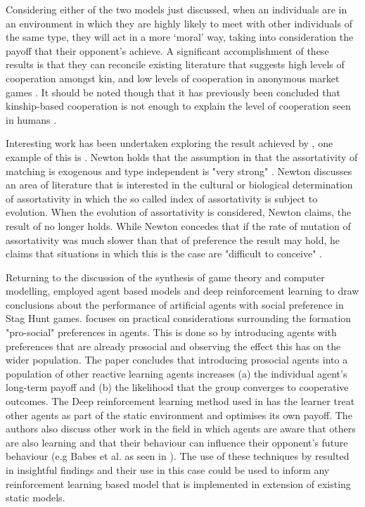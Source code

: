 \documentclass[11pt]{book}
\newcommand*{\np}{\par\noindent\newline}
\begin{document}
Considering either of the two models just discussed, when an individuals are in an environment in which they are highly likely
to meet with other individuals of the same type, they will act in a more `moral' way, taking into consideration the
payoff that their opponent's achieve. A significant accomplishment of these results is that they can reconcile existing
literature that suggests high levels of cooperation amongst kin, and low levels of cooperation in anonymous market games \citep[See ][~p. 2296]{alger_homo_2013}. 
It should be noted though that it has previously been concluded that kinship-based cooperation is not enough to explain the level of cooperation seen in humans \citep{van_veelen_why_2006}. 

\np Interesting work has been undertaken exploring the result achieved by \citet{alger_homo_2013}, one example of this
is \citet{newton_preferences_2017}. Newton holds that the assumption in \citet{alger_homo_2013} that the assortativity
of matching is exogenous and type independent is "very strong" \citep{newton_preferences_2017}. Newton discusses an area
of literature that is interested in the cultural or biological determination of assortativity in which the
so called index of assortativity is subject to evolution. When the evolution of assortativity is considered, Newton
claims, the result of \citet{alger_homo_2013} no longer holds. While Newton concedes that if the rate of mutation of
assortativity was much slower than that of preference the result may hold, he claims that situations in which this is
the case are "difficult to conceive" \citep{newton_preferences_2017}.

\np Returning to the discussion of the synthesis of game theory and computer modelling, \citet{peysakhovich_prosocial_2017} employed agent based models and deep reinforcement learning to draw conclusions about the performance of artificial agents with social preference in Stag Hunt games.
\citet{peysakhovich_prosocial_2017} focuses on practical considerations surrounding the formation "pro-social" preferences in agents.
This is done so by introducing agents with preferences that are already prosocial and observing the effect this has on the wider population.
The paper concludes that introducing prosocial agents into a population of other reactive learning agents increases 
(a) the individual agent's long-term payoff and 
(b) the likelihood that the group converges to cooperative outcomes. 
The Deep reinforcement learning method used in \citet{peysakhovich_prosocial_2017} has the learner treat other agents as part of the static environment and optimises its own payoff. The authors also discuss other work in the field in which agents are aware that others are also learning and that their behaviour can influence their opponent's future behaviour (e.g Babes et al. as seen in \citealt{peysakhovich_prosocial_2017}).
The use of these techniques by \citet{peysakhovich_prosocial_2017} resulted in insightful findings and their use in this case could be used to inform any reinforcement learning based model that is implemented in extension of existing static models.
\end{document}
